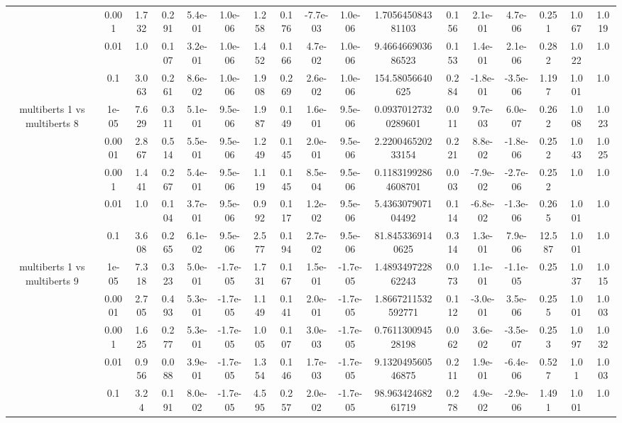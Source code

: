 \begin{tabular}{|c|c|c|c|c|c|c|c|c|c|c|c|c|c|c|c|c|}
 & 0.001 & 1.732 & 0.291 & 5.4e-01 & 1.0e-06 & 1.258 & 0.176 & -7.7e-03 & 1.0e-06 & 1.705645084381103 & 0.156 & 2.1e-01 & 4.7e-06 & 0.251 & 1.067 & 1.019 \\
 & 0.01 & 1.0 & 0.107 & 3.2e-01 & 1.0e-06 & 1.452 & 0.166 & 4.7e-02 & 1.0e-06 & 9.466466903686523 & 0.153 & 1.4e-01 & 2.1e-06 & 0.282 & 1.022 & 1.0 \\
 & 0.1 & 3.063 & 0.261 & 8.6e-02 & 1.0e-06 & 1.908 & 0.269 & 2.6e-02 & 1.0e-06 & 154.58056640625 & 0.284 & -1.8e-01 & -3.5e-06 & 1.197 & 1.001 & 1.0 \\
\hline
\multirow{5}{*}{multiberts 1 vs multiberts 8} & 1e-05 & 7.629 & 0.311 & 5.1e-01 & 9.5e-06 & 1.987 & 0.149 & 1.6e-01 & 9.5e-06 & 0.09370127320289601 & 0.011 & 9.7e-03 & 6.0e-07 & 0.262 & 1.008 & 1.023 \\
 & 0.0001 & 2.867 & 0.514 & 5.5e-01 & 9.5e-06 & 1.249 & 0.145 & 2.0e-01 & 9.5e-06 & 2.220046520233154 & 0.221 & 8.8e-02 & -1.8e-06 & 0.252 & 1.043 & 1.025 \\
 & 0.001 & 1.441 & 0.267 & 5.4e-01 & 9.5e-06 & 1.119 & 0.145 & 8.5e-04 & 9.5e-06 & 0.11831992864608701 & 0.003 & -7.9e-02 & -2.7e-06 & 0.252 & 1.0 & 1.0 \\
 & 0.01 & 1.0 & 0.104 & 3.7e-01 & 9.5e-06 & 0.992 & 0.117 & 1.2e-02 & 9.5e-06 & 5.436307907104492 & 0.114 & -6.8e-02 & -1.3e-06 & 0.265 & 1.001 & 1.0 \\
 & 0.1 & 3.608 & 0.265 & 6.1e-02 & 9.5e-06 & 2.577 & 0.194 & 2.7e-02 & 9.5e-06 & 81.8453369140625 & 0.314 & 1.3e-01 & 7.9e-06 & 12.587 & 1.001 & 1.0 \\
\hline
\multirow{5}{*}{multiberts 1 vs multiberts 9} & 1e-05 & 7.318 & 0.323 & 5.0e-01 & -1.7e-05 & 1.731 & 0.167 & 1.5e-01 & -1.7e-05 & 1.489349722862243 & 0.073 & 1.1e-01 & -1.1e-05 & 0.25 & 1.037 & 1.015 \\
 & 0.0001 & 2.705 & 0.493 & 5.3e-01 & -1.7e-05 & 1.149 & 0.141 & 2.0e-01 & -1.7e-05 & 1.8667211532592771 & 0.112 & -3.0e-01 & 3.5e-06 & 0.255 & 1.001 & 1.003 \\
 & 0.001 & 1.625 & 0.277 & 5.3e-01 & -1.7e-05 & 1.005 & 0.107 & 3.0e-03 & -1.7e-05 & 0.761130094528198 & 0.062 & 3.6e-02 & -3.5e-07 & 0.253 & 1.097 & 1.032 \\
 & 0.01 & 0.956 & 0.088 & 3.9e-01 & -1.7e-05 & 1.354 & 0.146 & 1.7e-03 & -1.7e-05 & 9.132049560546875 & 0.211 & 1.9e-01 & -6.4e-06 & 0.527 & 1.01 & 1.003 \\
 & 0.1 & 3.24 & 0.191 & 8.0e-02 & -1.7e-05 & 4.595 & 0.257 & 2.0e-02 & -1.7e-05 & 98.96342468261719 & 0.278 & 4.9e-02 & -2.9e-06 & 1.491 & 1.001 & 1.0 \\

\end{tabular}
